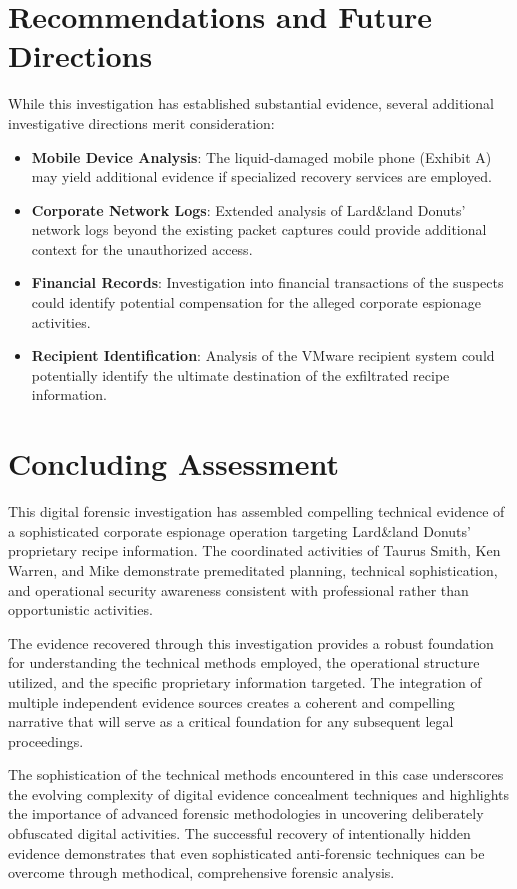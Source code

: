 \section{Recommendations and Future Directions}

While this investigation has established substantial evidence, several additional investigative directions merit consideration:

\begin{itemize}
    \item \textbf{Mobile Device Analysis}: The liquid-damaged mobile phone (Exhibit A) may yield additional evidence if specialized recovery services are employed.
    
    \item \textbf{Corporate Network Logs}: Extended analysis of Lard\&land Donuts' network logs beyond the existing packet captures could provide additional context for the unauthorized access.
    
    \item \textbf{Financial Records}: Investigation into financial transactions of the suspects could identify potential compensation for the alleged corporate espionage activities.
    
    \item \textbf{Recipient Identification}: Analysis of the VMware recipient system could potentially identify the ultimate destination of the exfiltrated recipe information.
\end{itemize}

\section{Concluding Assessment}
This digital forensic investigation has assembled compelling technical evidence of a sophisticated corporate espionage operation targeting Lard\&land Donuts' proprietary recipe information. The coordinated activities of Taurus Smith, Ken Warren, and Mike demonstrate premeditated planning, technical sophistication, and operational security awareness consistent with professional rather than opportunistic activities.

The evidence recovered through this investigation provides a robust foundation for understanding the technical methods employed, the operational structure utilized, and the specific proprietary information targeted. The integration of multiple independent evidence sources creates a coherent and compelling narrative that will serve as a critical foundation for any subsequent legal proceedings.

The sophistication of the technical methods encountered in this case underscores the evolving complexity of digital evidence concealment techniques and highlights the importance of advanced forensic methodologies in uncovering deliberately obfuscated digital activities. The successful recovery of intentionally hidden evidence demonstrates that even sophisticated anti-forensic techniques can be overcome through methodical, comprehensive forensic analysis.